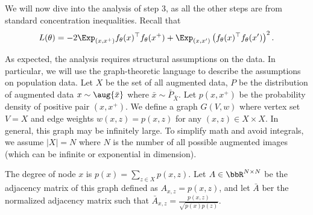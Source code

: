  We will now dive into the analysis of step 3, as all the other steps are from standard concentration inequalities. Recall that 
\begin{align}
		L(\theta)  = -2\Exp_{(x, x^+) } f_{{\theta}}(x)^\top f_{{\theta}}(x^+) + \Exp_{(x, x') }  \left(f_{{\theta}}(x)^\top f_{{\theta}}(x')\right)^2.
\end{align}

As expected, the analysis requires structural assumptions on the data. In particular, we will use the graph-theoretic language to describe the assumptions on population data. Let $X$ be the set of all augmented data, $P$ be the distribution of augmented data $x\sim\aug{\bar{x}}$ where $\bar{x}\sim\bar{P}_{\bar{X}}$. Let $p(x, x^+)$ be the probability density of positive pair $(x, x^+)$. We define a graph $G(V, w)$ where vertex set $V=X$ and edge weights $w(x, z) = p(x, z)$ for any $(x, z) \in X\times X$. In general, this graph may be infinitely large. To simplify math and avoid integrals, we assume $|X|=N$ where $N$ is the number of all possible augmented images (which can be infinite or exponential in dimension). 

The degree of node $x$ is $p(x) = \sum_{z\in X} p(x, z)$.  Let $A\in\bbR^{N\times N}$ be the adjacency matrix of this graph defined as $A_{x, z} = p(x, z)$, and let $\bar{A}$ ber the normalized adjacency matrix such that $\bar{A}_{x, z} = \frac{p(x, z)}{\sqrt{p(x)p(z)}}$. 

